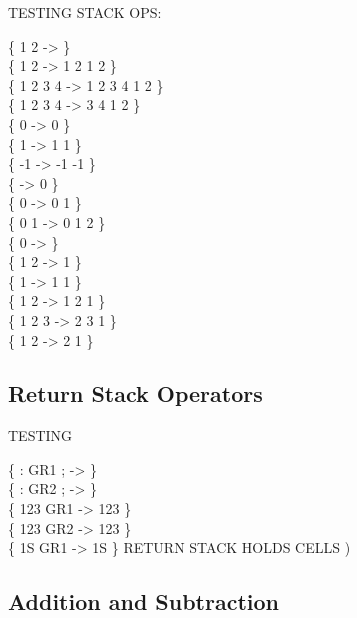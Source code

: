 \begin{tt}
TESTING STACK OPS: \small {}          

\{      1 2  ->               \} \\
\{      1 2   ->     1 2  1  2 \} \\
\{  1 2 3 4  -> 1 2 3 4  1  2 \} \\
\{  1 2 3 4  ->     3 4  1  2 \} \\
\{        0   ->             0 \} \\
\{        1   ->          1  1 \} \\
\{       -1   ->         -1 -1 \} \\
\{           ->             0 \} \\
\{        0  ->          0  1 \} \\
\{      0 1  ->       0  1  2 \} \\
\{        0   ->               \} \\
\{      1 2   ->             1 \} \\
\{        1    ->          1  1 \} \\
\{      1 2   ->       1  2  1 \} \\
\{    1 2 3    ->       2  3  1 \} \\
\{      1 2   ->          2  1 \}
\end{tt}

\subsection{Return Stack Operators}

\begin{tt}
TESTING   

\{ : GR1   ; -> \} \\
\{ : GR2     ; -> \} \\
\{ 123 GR1 -> 123 \} \\
\{ 123 GR2 -> 123 \} \\
\{ 1S GR1 -> 1S \} \tab[2]  RETURN STACK HOLDS CELLS )
\end{tt}

\subsection{Addition and Subtraction}

